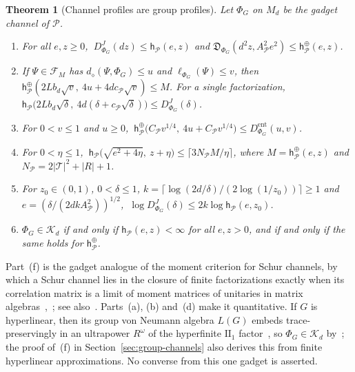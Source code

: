 \documentclass[11pt,a4paper]{article}
\theoremstyle{plain}
\newtheorem{theorem}{Theorem}[section]
\theoremstyle{definition}
\theoremstyle{remark}
\newcommand{\DChoi}{D^{J}}
\newcommand{\ddia}{d_\diamond}
\newcommand{\Dsupp}{\mathfrak{D}}
\begin{document}
\begin{theorem}[Channel profiles are group profiles]\label{thm:correspondence}
Let $\Phi_G$ on $M_d$ be the gadget channel of $\mathcal P$.
\begin{enumerate}[label=(\alph*)]
\item For all $e,z\ge0$, $\ \DChoi_{\Phi_G}(dz)\le\mathsf h_{\mathcal P}(e,z)$ and $\Dsupp_{\Phi_G}(d^2z,A_{\mathcal P}^2e^2)\le\mathsf h^\oplus_{\mathcal P}(e,z)$.
\item If $\Psi\in\mathcal F_M$ has $\ddia(\Psi,\Phi_G)\le u$ and $\ell_{\Phi_G}(\Psi)\le v$, then $\mathsf h^\oplus_{\mathcal P}(2Lb_d\sqrt v,\ 4u+4dc_{\mathcal P}\sqrt v)\le M$. For a single
factorization, $\mathsf h_{\mathcal P}\big(2Lb_d\sqrt\delta,\ 4d(\delta+c_{\mathcal P}\sqrt\delta)\big)\le\DChoi_{\Phi_G}(\delta)$.
\item For $0<v\le1$ and $u\ge0$, $\ \mathsf h^\oplus_{\mathcal P}\big(C_{\mathcal P}v^{1/4},\ 4u+C_{\mathcal P}v^{1/4}\big)\le D^{\mathrm{ent}}_{\Phi_G}(u,v)$.
\item For $0<\eta\le1$, $\ \mathsf h_{\mathcal P}\big(\sqrt{e^2+4\eta},\ z+\eta\big)\le\lceil3N_{\mathcal P}M/\eta\rceil$, where $M=\mathsf h^\oplus_{\mathcal P}(e,z)$ and $N_{\mathcal P}=2|\mathcal T|^2+|R|+1$.
\item For $z_0\in(0,1)$, $0<\delta\le1$, $k=\lceil\log(2d/\delta)/(2\log(1/z_0))\rceil\ge1$ and $e=(\delta/(2dkA_{\mathcal P}^2))^{1/2}$,
$\ \log\DChoi_{\Phi_G}(\delta)\le2k\log\mathsf h_{\mathcal P}(e,z_0)$.
\item $\Phi_G\in\mathcal K_d$ if and only if $\mathsf h_{\mathcal P}(e,z)<\infty$ for all $e,z>0$, and if and only if the same holds for $\mathsf h^\oplus_{\mathcal P}$.
\end{enumerate}
\end{theorem}

Part~(f) is the gadget analogue of the moment criterion for Schur channels, by which a Schur channel lies in the closure of finite
factorizations exactly when its correlation matrix is a limit of moment matrices of unitaries in matrix
algebras~\cite[Section~4]{MusatRordam2020},~\cite[Proposition~3.9(iii)]{Musat2025}; see also~\cite[Theorem~3.6]{HaagerupMusat2015}. Parts~(a),
(b) and~(d) make it quantitative. If $G$ is hyperlinear, then its group von Neumann algebra $L(G)$ embeds trace-preservingly in an ultrapower
$R^\omega$ of the hyperfinite $\mathrm{II}_1$ factor~\cite{Pestov2008}, so $\Phi_G\in\mathcal K_d$ by~\cite[Theorem~3.6]{HaagerupMusat2015}; the
proof of~(f) in Section~\ref{sec:group-channels} also derives this from finite hyperlinear approximations. No converse from this one gadget is
asserted.
\end{document}
